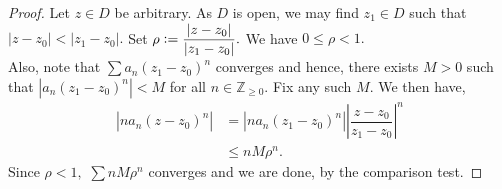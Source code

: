\diffseries*\label{lem:diffseries2}
\begin{flushright}\hyperref[lem:diffseries]{\upsym}\end{flushright}
\begin{proof}
	Let $z \in D$ be arbitrary. As $D$ is open, we may find $z_1 \in D$ such that $|z - z_0| < |z_1 - z_0|.$ Set $\rho \vcentcolon= \dfrac{|z - z_0|}{|z_1 - z_0|}.$ We have $0 \le \rho < 1.$\\
	Also, note that $\sum a_n(z_1 - z_0)^n$ converges and hence, there exists $M > 0$ such that $|a_n(z_1 - z_0)^n| < M$ for all $n \in \mathbb{Z}_{\ge 0}.$ Fix any such $M.$ We then have,
	\begin{align*} 
		|na_n(z - z_0)^n| &= |na_n(z_1 - z_0)^n|\left|\dfrac{z - z_0}{z_1 - z_0}\right|^n\\
		&\le nM\rho^n.
	\end{align*}
	Since $\rho < 1,$ $\sum nM\rho^n$ converges and we are done, by the comparison test.
\end{proof}


